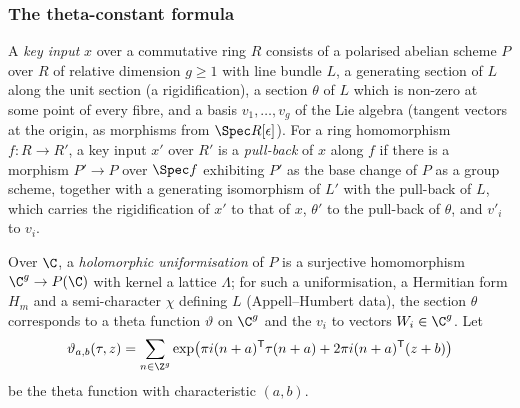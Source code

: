 \subsubsection{The theta-constant formula}
\begin{definition}\label{pf:sh-local:def:keyin}
A \emph{key input} $x$ over a commutative ring $R$ consists of a polarised abelian scheme $P$ over $R$ of relative
dimension $g\ge1$ with line bundle $L$, a generating section of $L$ along the unit section (a rigidification), a section
$\theta$ of $L$ which is non-zero at some point of every fibre, and a basis $v_1,\dots,v_g$ of the Lie algebra (tangent
vectors at the origin, as morphisms from $\Spec R[\epsilon]$). For a ring homomorphism $f:R\to R'$, a key input $x'$
over $R'$ is a \emph{pull-back} of $x$ along $f$ if there is a morphism $P'\to P$ over $\Spec f$ exhibiting $P'$ as the
base change of $P$ as a group scheme, together with a generating isomorphism of $L'$ with the pull-back of $L$, which
carries the rigidification of $x'$ to that of $x$, $\theta'$ to the pull-back of $\theta$, and $v'_i$ to $v_i$.
\end{definition}

Over $\C$, a \emph{holomorphic uniformisation}
of $P$ is a surjective homomorphism $\C^g\to P(\C)$ with kernel a lattice $\Lambda$; for such a uniformisation, a
Hermitian form $H_m$ and a semi-character $\chi$ defining $L$ (Appell--Humbert data), the section $\theta$ corresponds
to a theta function $\vartheta$ on $\C^g$ and the $v_i$ to vectors $W_i\in\C^g$. Let
\[
\vartheta_{a,b}(\tau,z)=\sum_{n\in\Z^g}\exp\bigl(\pi i(n+a)^{\mathsf T}\tau(n+a)+2\pi i(n+a)^{\mathsf T}(z+b)\bigr)
\]
be the theta function with characteristic $(a,b)$.

